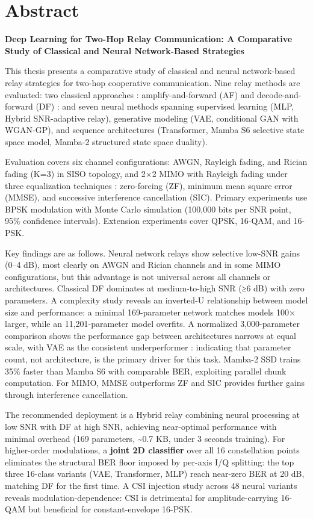 \chapter*{Abstract}

\label{sec:abstract-english}


\textbf{Deep Learning for Two-Hop Relay Communication: A Comparative Study of Classical and Neural Network-Based Strategies}

This thesis presents a comparative study of classical and neural network-based relay strategies for two-hop cooperative communication. Nine relay methods are evaluated: two classical approaches : amplify-and-forward (AF) and decode-and-forward (DF) : and seven neural methods spanning supervised learning (MLP, Hybrid SNR-adaptive relay), generative modeling (VAE, conditional GAN with WGAN-GP), and sequence architectures (Transformer, Mamba S6 selective state space model, Mamba-2 structured state space duality).

Evaluation covers six channel configurations: AWGN, Rayleigh fading, and Rician fading (K=3) in SISO topology, and 2×2 MIMO with Rayleigh fading under three equalization techniques : zero-forcing (ZF), minimum mean square error (MMSE), and successive interference cancellation (SIC). Primary experiments use BPSK modulation with Monte Carlo simulation (100,000 bits per SNR point, 95\% confidence intervals). Extension experiments cover QPSK, 16-QAM, and 16-PSK.

Key findings are as follows. Neural network relays show selective low-SNR gains (0--4 dB), most clearly on AWGN and Rician channels and in some MIMO configurations, but this advantage is not universal across all channels or architectures. Classical DF dominates at medium-to-high SNR (≥6 dB) with zero parameters. A complexity study reveals an inverted-U relationship between model size and performance: a minimal 169-parameter network matches models 100× larger, while an 11,201-parameter model overfits. A normalized 3,000-parameter comparison shows the performance gap between architectures narrows at equal scale, with VAE as the consistent underperformer : indicating that parameter count, not architecture, is the primary driver for this task. Mamba-2 SSD trains 35\% faster than Mamba S6 with comparable BER, exploiting parallel chunk computation. For MIMO, MMSE outperforms ZF and SIC provides further gains through interference cancellation.

The recommended deployment is a Hybrid relay combining neural processing at low SNR with DF at high SNR, achieving near-optimal performance with minimal overhead (169 parameters, \textasciitilde0.7 KB, under 3 seconds training). For higher-order modulations, a \textbf{joint 2D classifier} over all 16 constellation points eliminates the structural BER floor imposed by per-axis I/Q splitting: the top three 16-class variants (VAE, Transformer, MLP) reach near-zero BER at 20 dB, matching DF for the first time. A CSI injection study across 48 neural variants reveals modulation-dependence: CSI is detrimental for amplitude-carrying 16-QAM but beneficial for constant-envelope 16-PSK.

